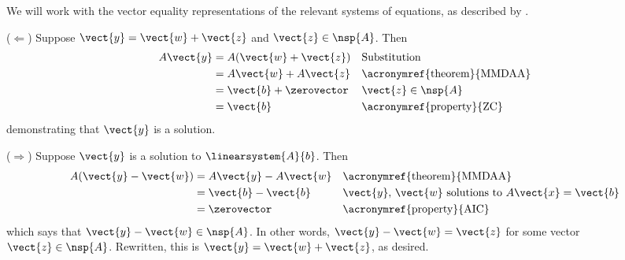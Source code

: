 We will work with the vector equality representations of the relevant systems of equations, as described by .\par
%
($\Leftarrow$)  Suppose $\vect{y}=\vect{w}+\vect{z}$ and $\vect{z}\in\nsp{A}$.  Then
%
\begin{align*}
A\vect{y}&=A(\vect{w}+\vect{z})&&\text{Substitution}\\
&=A\vect{w}+A\vect{z}&&\text{\acronymref{theorem}{MMDAA}}\\
&=\vect{b}+\zerovector&&\vect{z}\in\nsp{A}\\
&=\vect{b}&&\text{\acronymref{property}{ZC}}\\
\end{align*}
%
demonstrating that $\vect{y}$ is a solution.\par
%
($\Rightarrow$)  Suppose $\vect{y}$ is a solution to $\linearsystem{A}{b}$.  Then
%
\begin{align*}
A(\vect{y}-\vect{w})
&=A\vect{y}-A\vect{w}&&\text{\acronymref{theorem}{MMDAA}}\\
&=\vect{b}-\vect{b}&&\text{$\vect{y},\,\vect{w}$ solutions to $A\vect{x}=\vect{b}$}\\
&=\zerovector&&\text{\acronymref{property}{AIC}}\\
\end{align*}
%
which says that $\vect{y}-\vect{w}\in\nsp{A}$.  In other words, $\vect{y}-\vect{w}=\vect{z}$ for some vector $\vect{z}\in\nsp{A}$.  Rewritten, this is 
$\vect{y}=\vect{w}+\vect{z}$, as desired.